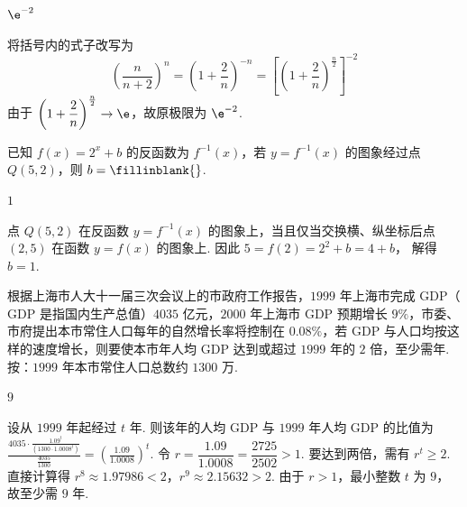 \begin{answer}
\(\e^{-2}\)
\end{answer}

\begin{solution}
将括号内的式子改写为
\[
\left(\frac{n}{n+2}\right)^n
=\left(1+\frac{2}{n}\right)^{-n}
=\left[\left(1+\frac{2}{n}\right)^{\frac{n}{2}}\right]^{-2}
\]
由于 \(\left(1+\dfrac{2}{n}\right)^{\frac{n}{2}}\to\e\)，故原极限为 \(\e^{-2}\).
\end{solution}

\begin{problem}
已知 \(f(x)=2^x+b\) 的反函数为 \(f^{-1}(x)\)，若 \(y=f^{-1}(x)\) 的图象经过点 \(Q(5,2)\)，则 \(b=\fillinblank{}\).
\end{problem}

\begin{answer}
\(1\)
\end{answer}

\begin{solution}
点 \(Q(5,2)\) 在反函数 \(y=f^{-1}(x)\) 的图象上，当且仅当交换横、纵坐标后点 \((2,5)\) 在函数 \(y=f(x)\) 的图象上. 因此
\(5=f(2)=2^2+b=4+b\)，
解得 \(b=1\).
\end{solution}

\begin{problem}
根据上海市人大十一届三次会议上的市政府工作报告，\(1999\) 年上海市完成 \(\mathrm{GDP}\)（\(\mathrm{GDP}\) 是指国内生产总值）\(4035\text{ 亿元}\)，\(2000\) 年上海市 \(\mathrm{GDP}\) 预期增长 \(9\%\)，市委、市府提出本市常住人口每年的自然增长率将控制在 \(0.08\%\)，若 \(\mathrm{GDP}\) 与人口均按这样的速度增长，则要使本市年人均 \(\mathrm{GDP}\) 达到或超过 \(1999\) 年的 \(2\) 倍，至少需\fillinblank{}\(\text{年}\).按：\(1999\) 年本市常住人口总数约 \(1300\text{ 万}\).
\end{problem}

\begin{answer}
\(9\)
\end{answer}

\begin{solution}
设从 \(1999\) 年起经过 \(t\) 年. 则该年的人均 \(\mathrm{GDP}\) 与 \(1999\) 年人均 \(\mathrm{GDP}\) 的比值为
\(\frac{4035\cdot\frac{1.09^t}{(1300\cdot1.0008^t)}}{\frac{4035}{1300}}=\left(\frac{1.09}{1.0008}\right)^t\).
令 \(r=\dfrac{1.09}{1.0008}=\dfrac{2725}{2502}>1\). 要达到两倍，需有 \(r^t\geqslant2\). 直接计算得
\(r^8\approx1.97986<2\)，\(r^9\approx2.15632>2\).
由于 \(r>1\)，最小整数 \(t\) 为 \(9\)，故至少需 \(9\) 年.
\end{solution}

